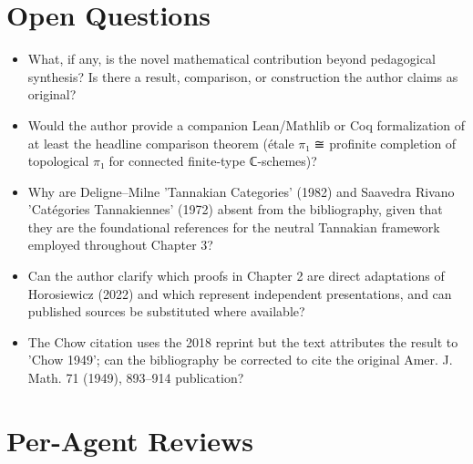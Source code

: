 \documentclass[11pt]{article}
\begin{document}
\section*{Open Questions}
\begin{itemize}[leftmargin=*]
  \item What, if any, is the novel mathematical contribution beyond pedagogical synthesis? Is there a result, comparison, or construction the author claims as original?
  \item Would the author provide a companion Lean/Mathlib or Coq formalization of at least the headline comparison theorem (étale \ensuremath{\pi}₁ ≅ profinite completion of topological \ensuremath{\pi}₁ for connected finite-type ℂ-schemes)?
  \item Why are Deligne--Milne 'Tannakian Categories' (1982) and Saavedra Rivano 'Catégories Tannakiennes' (1972) absent from the bibliography, given that they are the foundational references for the neutral Tannakian framework employed throughout Chapter 3?
  \item Can the author clarify which proofs in Chapter 2 are direct adaptations of Horosiewicz (2022) and which represent independent presentations, and can published sources be substituted where available?
  \item The Chow citation uses the 2018 reprint but the text attributes the result to 'Chow 1949'; can the bibliography be corrected to cite the original Amer. J. Math. 71 (1949), 893--914 publication?
\end{itemize}

\section*{Per-Agent Reviews}
\end{document}

